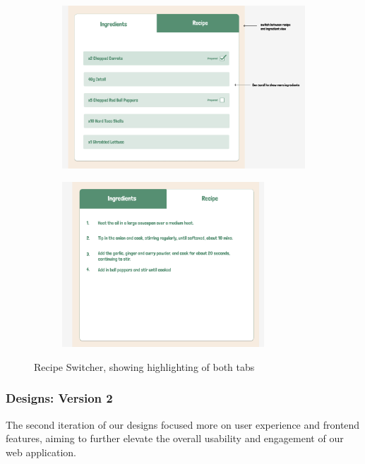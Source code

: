 \documentclass{article}
\begin{document}
\begin{figure}[t]
  \centering
  \begin{subfigure}{0.45\linewidth}
    \includegraphics[width=\textwidth]{assets/Version 1 Recipe Switcher ingredients.png}
  \end{subfigure}
  \hfill
  \begin{subfigure}{0.45\linewidth}
    \includegraphics[width=0.83\textwidth]{assets/Version 1 Recipe Switcher recipe.png}
  \end{subfigure}
  \caption{Recipe Switcher, showing highlighting of both tabs}
\end{figure}



\subsubsection{Designs: Version 2}
The second iteration of our designs focused more on user experience and frontend features, aiming to further elevate the overall usability and engagement of our web application.
\end{document}
